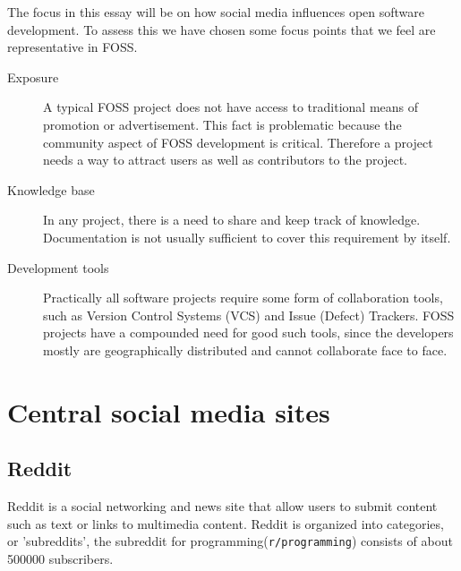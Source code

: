 \documentclass[a4paper,11pt]{article} %
\begin{document}
The focus in this essay will be on how social media influences open software
development. To assess this we have chosen some focus points that we feel
are representative in FOSS.

\begin{description}
\item[Exposure] \hfill
  
  A typical FOSS project does not have access to traditional means of
  promotion or advertisement. This fact is problematic because the community
  aspect of FOSS development is critical. Therefore a project needs a way to
  attract users as well as contributors to the project.
\item[Knowledge base] \hfill

  In any project, there is a need to share and keep track of
  knowledge. Documentation is not usually sufficient to cover this
  requirement by itself.
\item[Development tools] \hfill
  
  Practically all software projects require some form of collaboration
  tools, such as Version Control Systems (VCS) and Issue (Defect)
  Trackers. FOSS projects have a compounded need for good such tools, since
  the developers mostly are geographically distributed and cannot
  collaborate face to face.
\end{description}




\section{Central social media sites}

\subsection{Reddit}

Reddit is a social networking and news site that allow users to submit
content such as text or links to multimedia content. Reddit is organized
into categories, or 'subreddits', the subreddit for
programming(\texttt{r/programming}) consists of about \num{500000}
subscribers.
\end{document}
